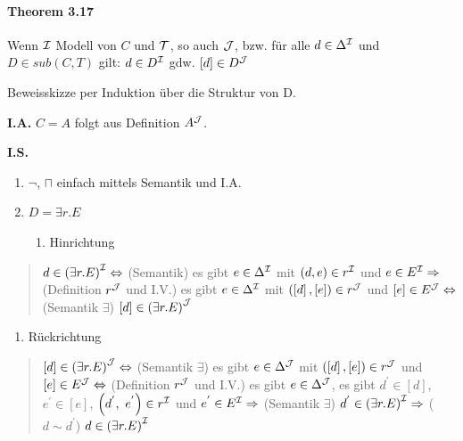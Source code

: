 \hypertarget{theorem-3.17}{\paragraph{Theorem 3.17}\label{theorem-3.17}}

Wenn $\mathcal{I}$ Modell von $C$ und $\mathcal{T}$, so auch $\mathcal{J}$, bzw. für alle
$d \in \Delta^{\mathcal{I}}$ und $D \in sub(C,T)$ gilt: $d \in D^{\mathcal{I}}$ gdw.
$\left\lbrack d \right\rbrack \in D^{\mathcal{J}}$

Beweisskizze per Induktion über die Struktur von D.

\textbf{I.A.} $C = A$ folgt aus Definition $A^{\mathcal{J}}$.

\textbf{I.S.}

\begin{enumerate}
\def\labelenumi{\arabic{enumi}.}
\item
  $\neg$, $\sqcap$ einfach mittels Semantik und I.A.
\item
  $D = \exists r.E$

  \begin{enumerate}
  \def\labelenumii{\alph{enumii}.}
  \item
    Hinrichtung
  \end{enumerate}
\end{enumerate}

\begin{quote}
$d \in \left( \exists r.E \right)^{\mathcal{I}} \Leftrightarrow$ (Semantik) es
gibt $e \in \Delta^{\mathcal{I}}$ mit $\left( d,e \right) \in r^{\mathcal{I}}$ und
$e \in E^{\mathcal{I}} \Rightarrow$ (Definition $r^{\mathcal{J}}$ und I.V.) es gibt
$e \in \Delta^{\mathcal{I}}$ mit
$\left( \left\lbrack d \right\rbrack,\left\lbrack e \right\rbrack \right) \in r^{\mathcal{J}}$
und $\left\lbrack e \right\rbrack \in E^{\mathcal{J}} \Leftrightarrow$ (Semantik
$\exists$)
$\left\lbrack d \right\rbrack \in \left( \exists r.E \right)^{\mathcal{J}}$
\end{quote}

\begin{enumerate}
\def\labelenumi{\alph{enumi}.}
\item
  Rückrichtung
\end{enumerate}

\begin{quote}
$\left\lbrack d \right\rbrack \in \left( \exists r.E \right)^{\mathcal{J}} \Leftrightarrow$
(Semantik $\exists$) es gibt $e \in \Delta^{\mathcal{J}}$ mit
$\left( \left\lbrack d \right\rbrack,\left\lbrack e \right\rbrack \right) \in r^{\mathcal{J}}$
und $\left\lbrack e \right\rbrack \in E^{\mathcal{J}} \Leftrightarrow$
(Definition $r^{\mathcal{J}}$ und I.V.) es gibt $e \in \Delta^{\mathcal{J}}$, es gibt
$d^{'} \in \left\lbrack d \right\rbrack$,
$e^{'} \in \left\lbrack e \right\rbrack$,
$\left( d^{'},\ e^{'} \right) \in r^{\mathcal{I}}$ und
$e^{'} \in E^{\mathcal{I}} \Rightarrow$ (Semantik $\exists$)
$d^{'} \in \left( \exists r.E \right)^{\mathcal{I}} \Rightarrow$
($d \sim d^{'}$) $d \in \left( \exists r.E \right)^{\mathcal{I}}$
\end{quote}

